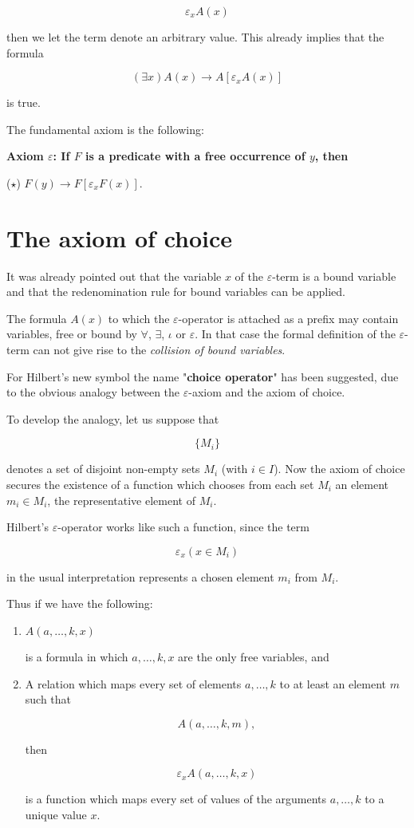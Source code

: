 \documentclass[12pt]{article}
\begin{document}
$$\varepsilon_{x} A (x)$$ 

then we let the term denote an arbitrary value. This already implies that the formula

$$(\exists x) A (x) \to A [\varepsilon_{x} A (x)]$$
 
is true.

The fundamental axiom is the following:

\begin{center}
\textbf{Axiom $\varepsilon$: If $F$ is a predicate with a free occurrence of $y$, then} 

($\star$) \qquad \qquad $F (y) \to F [\varepsilon_{x} F (x)]$.
\end{center}

\section{The axiom of choice}\normalsize

It was already pointed out that the variable $x$ of the $\varepsilon$-term is a bound variable and that the redenomination rule for bound variables can be applied.

The formula $A (x)$ to which the $\varepsilon$-operator is attached as a prefix may contain variables, free or bound by $\forall$, $\exists$, $\iota$ or $\varepsilon$. In that case the formal definition of the $\varepsilon$-term can not give rise to the \emph{collision of bound variables}.

For Hilbert's new symbol the name "\textbf{choice operator}" has been suggested, due to the obvious analogy between the $\varepsilon$-axiom and the axiom of choice.

To develop the analogy, let us suppose that

$$\{M_{i}\}$$

denotes a set of disjoint non-empty sets $M_{i}$ (with $i \in I$). Now the axiom of choice secures the existence of a function which chooses from each set $M_{i}$ an element $m_{i} \in M_{i}$, the representative element of $M_{i}$. 

Hilbert's $\varepsilon$-operator works like such a function, since the term

$$\varepsilon_{x} (x \in M_{i})$$ 

in the usual interpretation represents a chosen element $m_{i}$ from $M_{i}$.

Thus if we have the following:

\begin{enumerate}
\item $A (a, \ldots, k, x)$
 
is a formula in which $a, \ldots, k, x$ are the only free variables, and 

\item A relation which maps every set of elements $a, \ldots, k$ to at least an element $m$ such that 

$$A (a,\ldots, k, m),$$

then

$$\varepsilon_{x} A (a,\ldots, k, x)$$

is a function which maps every set of values of the arguments $a,\ldots, k$ to a unique value $x$.
\end{enumerate}
\end{document}
